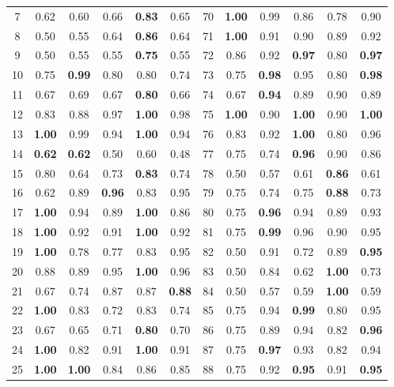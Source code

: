 \documentclass{article}
\begin{document}
{\begin{longtable}{cccccc@{\qquad}cccccc}
7 & 0.62 & 0.60 & 0.66 & \textbf{0.83} & 0.65 & 70 & \textbf{1.00} & 0.99 & 0.86 & 0.78 & 0.90 \\
8 & 0.50 & 0.55 & 0.64 & \textbf{0.86} & 0.64 & 71 & \textbf{1.00} & 0.91 & 0.90 & 0.89 & 0.92 \\
9 & 0.50 & 0.55 & 0.55 & \textbf{0.75} & 0.55 & 72 & 0.86 & 0.92 & \textbf{0.97} & 0.80 & \textbf{0.97} \\
10 & 0.75 & \textbf{0.99} & 0.80 & 0.80 & 0.74 & 73 & 0.75 & \textbf{0.98} & 0.95 & 0.80 & \textbf{0.98} \\
11 & 0.67 & 0.69 & 0.67 & \textbf{0.80} & 0.66 & 74 & 0.67 & \textbf{0.94} & 0.89 & 0.90 & 0.89 \\
12 & 0.83 & 0.88 & 0.97 & \textbf{1.00} & 0.98 & 75 & \textbf{1.00} & 0.90 & \textbf{1.00} & 0.90 & \textbf{1.00} \\
13 & \textbf{1.00} & 0.99 & 0.94 & \textbf{1.00} & 0.94 & 76 & 0.83 & 0.92 & \textbf{1.00} & 0.80 & 0.96 \\
14 & \textbf{0.62} & \textbf{0.62} & 0.50 & 0.60 & 0.48 & 77 & 0.75 & 0.74 & \textbf{0.96} & 0.90 & 0.86 \\
15 & 0.80 & 0.64 & 0.73 & \textbf{0.83} & 0.74 & 78 & 0.50 & 0.57 & 0.61 & \textbf{0.86} & 0.61 \\
16 & 0.62 & 0.89 & \textbf{0.96} & 0.83 & 0.95 & 79 & 0.75 & 0.74 & 0.75 & \textbf{0.88} & 0.73 \\
17 & \textbf{1.00} & 0.94 & 0.89 & \textbf{1.00} & 0.86 & 80 & 0.75 & \textbf{0.96} & 0.94 & 0.89 & 0.93 \\
18 & \textbf{1.00} & 0.92 & 0.91 & \textbf{1.00} & 0.92 & 81 & 0.75 & \textbf{0.99} & 0.96 & 0.90 & 0.95 \\
19 & \textbf{1.00} & 0.78 & 0.77 & 0.83 & 0.95 & 82 & 0.50 & 0.91 & 0.72 & 0.89 & \textbf{0.95} \\
20 & 0.88 & 0.89 & 0.95 & \textbf{1.00} & 0.96 & 83 & 0.50 & 0.84 & 0.62 & \textbf{1.00} & 0.73 \\
21 & 0.67 & 0.74 & 0.87 & 0.87 & \textbf{0.88} & 84 & 0.50 & 0.57 & 0.59 & \textbf{1.00} & 0.59 \\
22 & \textbf{1.00} & 0.83 & 0.72 & 0.83 & 0.74 & 85 & 0.75 & 0.94 & \textbf{0.99} & 0.80 & 0.95 \\
23 & 0.67 & 0.65 & 0.71 & \textbf{0.80} & 0.70 & 86 & 0.75 & 0.89 & 0.94 & 0.82 & \textbf{0.96} \\
24 & \textbf{1.00} & 0.82 & 0.91 & \textbf{1.00} & 0.91 & 87 & 0.75 & \textbf{0.97} & 0.93 & 0.82 & 0.94 \\
25 & \textbf{1.00} & \textbf{1.00} & 0.84 & 0.86 & 0.85 & 88 & 0.75 & 0.92 & \textbf{0.95} & 0.91 & \textbf{0.95} \\

\end{longtable}}
\end{document}
